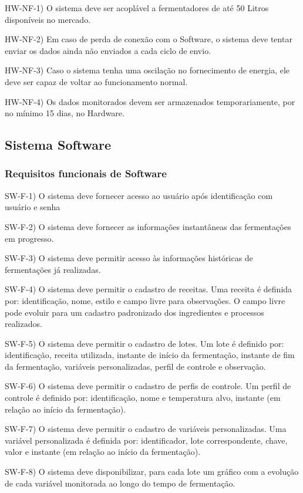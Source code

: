 HW-NF-1) O sistema deve ser acoplável a fermentadores de até 50 Litros disponíveis no mercado.

HW-NF-2) Em caso de perda de conexão com o Software, o sistema deve tentar enviar os dados ainda não enviados a cada ciclo de envio.

HW-NF-3) Caso o sistema tenha uma oscilação no fornecimento de energia, ele deve ser capaz de voltar ao funcionamento normal.

HW-NF-4) Os dados monitorados devem ser armazenados temporariamente, por no mínimo 15 dias, no Hardware.

\subsection{Sistema Software}

\subsubsection{Requisitos funcionais de Software}

SW-F-1) O sistema deve fornecer acesso ao usuário após identificação com usuário e senha

SW-F-2) O sistema deve fornecer as informações instantâneas das fermentações em progresso.

SW-F-3) O sistema deve permitir acesso às informações históricas de fermentações já realizadas.

SW-F-4) O sistema deve permitir o cadastro de receitas. Uma receita é definida por: identificação, nome, estilo e campo livre para observações. O campo livre pode evoluir para um cadastro padronizado dos ingredientes e processos realizados.

SW-F-5) O sistema deve permitir o cadastro de lotes. Um lote é definido por: identificação, receita utilizada, instante de início da fermentação, instante de fim da fermentação, variáveis personalizadas, perfil de controle e observação.

SW-F-6) O sistema deve permitir o cadastro de perfis de controle. Um perfil de controle é definido por: identificação, nome e temperatura alvo, instante (em relação ao início da fermentação).

SW-F-7) O sistema deve permitir o cadastro de variáveis personalizadas. Uma variável personalizada é definida por: identificador, lote correspondente, chave, valor e instante (em relação ao início da fermentação).

SW-F-8) O sistema deve disponibilizar, para cada lote um gráfico com a evolução de cada variável monitorada ao longo do tempo de fermentação.

